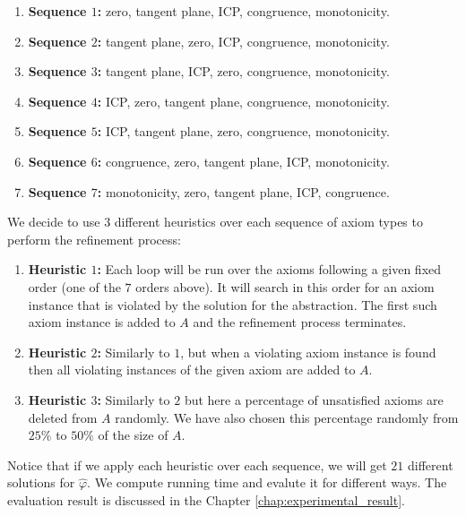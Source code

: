 \begin{enumerate}
    \item \textbf{Sequence $1$:} zero, tangent plane, ICP, congruence, monotonicity. \label{item:sequences}
    \item \textbf{Sequence $2$:} tangent plane, zero, ICP, congruence, monotonicity.
    \item \textbf{Sequence $3$:} tangent plane, ICP, zero, congruence, monotonicity.
    \item \textbf{Sequence $4$:} ICP, zero, tangent plane, congruence, monotonicity.
    \item \textbf{Sequence $5$:} ICP, tangent plane, zero, congruence, monotonicity.
    \item \textbf{Sequence $6$:} congruence, zero, tangent plane, ICP, monotonicity.
    \item \textbf{Sequence $7$:} monotonicity, zero, tangent plane, ICP, congruence.
\end{enumerate}

\noindent We decide to use $3$ different heuristics over each sequence of axiom types to perform the refinement process:

\begin{enumerate}
\label{item:heuristics}
    \item \textbf{Heuristic $1$:} Each loop will be run over the axioms following a given fixed order (one of the $7$ orders above).
    It will search in this order for an axiom instance that is violated by the solution for the abstraction.
    The first such axiom instance is added to $A$ and the refinement process terminates.
    \item \textbf{Heuristic $2$:} Similarly to $1$, but when a violating axiom instance is found then all violating instances of the given axiom are added to $A$.
    \item \textbf{Heuristic $3$:} Similarly to $2$ but here a percentage of unsatisfied axioms are deleted from $A$ randomly.
    We have also chosen this percentage randomly from $25\%$ to $50\%$ of the size of $A$.
\end{enumerate}

\noindent Notice that if we apply each heuristic over each sequence, we will get $21$ different solutions for $\hat{\varphi}$.
We compute running time and evalute it for different ways.
The evaluation result is discussed in the Chapter \ref{chap:experimental_result}.



